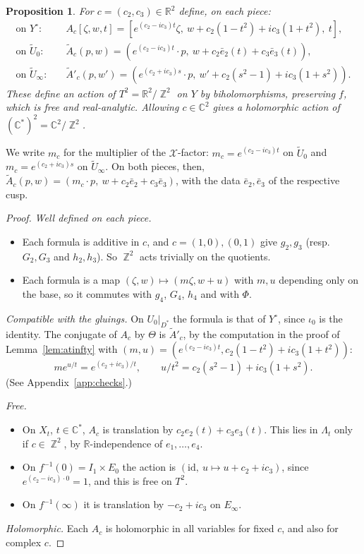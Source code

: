 \documentclass{article}
\DeclareMathOperator{\Z}{\mathbb{Z}}
\newtheorem{proposition}[theorem]{Proposition}
\theoremstyle{definition}
\theoremstyle{plain}
\newcommand{\R}{\mathbb{R}}
\newcommand{\C}{\mathbb{C}}
\newcommand{\cX}{\mathcal{X}}
\newcommand{\eb}{\bar e}
\newcommand{\Ut}{\widetilde{U}}
\newcommand{\Yo}{Y^{\circ}}
\begin{document}
\begin{proposition}\label{prop:torus}
For $c=(c_2,c_3)\in\R^2$ define, on each piece:
\begin{align*}
\text{on }\Yo:\quad &A_c[\zeta,w,t]=[e^{(c_2-ic_3)t}\zeta,\ w+c_2(1-t^2)+ic_3(1+t^2),\ t],\\
\text{on }\Ut_0:\quad &\tilde A_c(p,w)=(e^{(c_2-ic_3)t}\cdot p,\ w+c_2\eb_2(t)+c_3\eb_3(t)),\\
\text{on }\Ut_\infty:\quad &\tilde A'_c(p,w')=(e^{(c_2+ic_3)s}\cdot p,\ w'+c_2(s^2-1)+ic_3(1+s^2)).
\end{align*}
These define an action of $T^2=\R^2/\Z^2$ on $Y$ by biholomorphisms, preserving $f$,
which is free and real-analytic. Allowing $c\in\C^2$ gives a holomorphic action of
$(\C^*)^2=\C^2/\Z^2$.
\end{proposition}
We write $m_c$ for the multiplier of the $\cX$-factor: $m_c=e^{(c_2-ic_3)t}$ on $\Ut_0$
and $m_c=e^{(c_2+ic_3)s}$ on $\Ut_\infty$. On both pieces, then,
$\tilde A_c(p,w)=(m_c\cdot p,\ w+c_2\eb_2+c_3\eb_3)$, with the data $\eb_2,\eb_3$ of the
respective cusp.
\begin{proof}
\emph{Well defined on each piece.}
\begin{itemize}
\item Each formula is additive in $c$, and $c=(1,0),(0,1)$ give $g_2,g_3$ (resp.\
  $G_2,G_3$ and $h_2,h_3$). So $\Z^2$ acts trivially on the quotients.
\item Each formula is a map $(\zeta,w)\mapsto(m\zeta,w+u)$ with $m,u$ depending only on
  the base, so it commutes with $g_4$, $G_4$, $h_4$ and with $\Phi$.
\end{itemize}
\emph{Compatible with the gluings.} On $U_0|_{D^*}$ the formula is that of $\Yo$, since
$\iota_0$ is the identity. The conjugate of $A_c$ by $\Theta$ is $\tilde A'_c$, by the
computation in the proof of Lemma~\ref{lem:atinfty} with
$(m,u)=(e^{(c_2-ic_3)t},c_2(1-t^2)+ic_3(1+t^2))$:
\[me^{u/t}=e^{(c_2+ic_3)/t},\qquad u/t^2=c_2(s^2-1)+ic_3(1+s^2).\]
(See Appendix~\ref{app:checks}.)

\emph{Free.}
\begin{itemize}
\item On $X_t$, $t\in\C^*$, $A_c$ is translation by $c_2e_2(t)+c_3e_3(t)$. This lies in
  $\Lambda_t$ only if $c\in\Z^2$, by $\R$-independence of $e_1,\dots,e_4$.
\item On $f^{-1}(0)=I_1\times E_0$ the action is $(\mathrm{id},\ u\mapsto u+c_2+ic_3)$,
  since $e^{(c_2-ic_3)\cdot0}=1$, and this is free on $T^2$.
\item On $f^{-1}(\infty)$ it is translation by $-c_2+ic_3$ on $E_\infty$.
\end{itemize}
\emph{Holomorphic.} Each $A_c$ is holomorphic in all variables for fixed $c$, and also
for complex $c$.
\end{proof}
\end{document}
